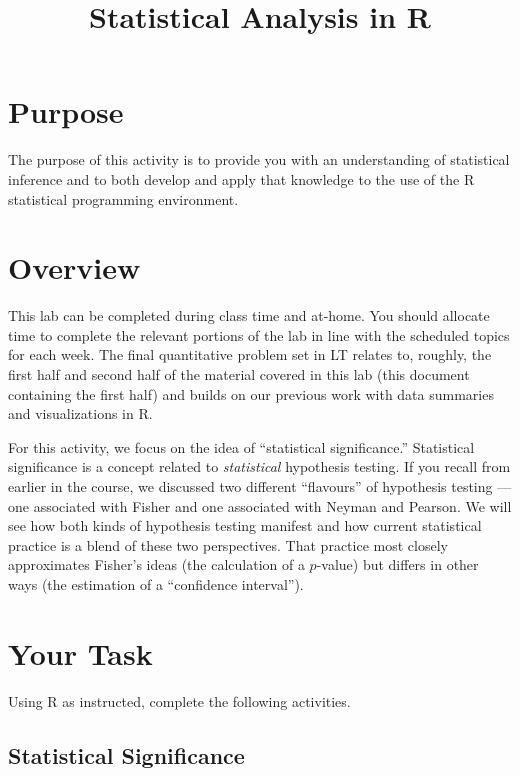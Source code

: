\documentclass[a4paper,12pt]{article}
\title{Statistical Analysis in R}
\author{}
\date{}
\begin{document}
\vspace{-4em}

\maketitle

\vspace{-4em}

\section{Purpose}

The purpose of this activity is to provide you with an understanding of statistical inference and to both develop and apply that knowledge to the use of the R statistical programming environment.

\section{Overview}

This lab can be completed during class time and at-home. You should allocate time to complete the relevant portions of the lab in line with the scheduled topics for each week. The final quantitative problem set in LT relates to, roughly, the first half and second half of the material covered in this lab (this document containing the first half) and builds on our previous work with data summaries and visualizations in R.

For this activity, we focus on the idea of ``statistical significance.'' Statistical significance is a concept related to \textit{statistical} hypothesis testing. If you recall from earlier in the course, we discussed two different ``flavours'' of hypothesis testing --- one associated with Fisher and one associated with Neyman and Pearson. We will see how both kinds of hypothesis testing manifest and how current statistical practice is a blend of these two perspectives. That practice most closely approximates Fisher's ideas (the calculation of a $p$-value) but differs in other ways (the estimation of a ``confidence interval'').

\section{Your Task}

Using R as instructed, complete the following activities.

\subsection{Statistical Significance}
\end{document}
